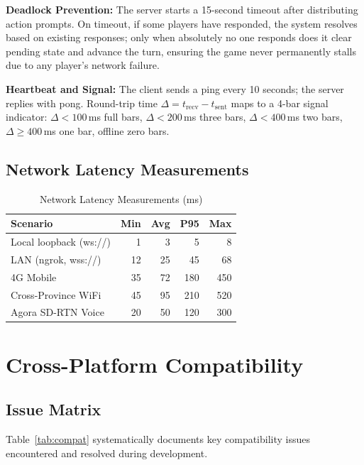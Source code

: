 \documentclass[11pt,a4paper]{article}
\begin{document}
\textbf{Deadlock Prevention:} The server starts a 15-second timeout after distributing action prompts. On timeout, if some players have responded, the system resolves based on existing responses; only when absolutely no one responds does it clear pending state and advance the turn, ensuring the game never permanently stalls due to any player's network failure.

\textbf{Heartbeat and Signal:} The client sends a ping every 10 seconds; the server replies with pong. Round-trip time $\Delta = t_{\text{recv}} - t_{\text{sent}}$ maps to a 4-bar signal indicator: $\Delta < 100$\,ms full bars, $\Delta < 200$\,ms three bars, $\Delta < 400$\,ms two bars, $\Delta \geq 400$\,ms one bar, offline zero bars.

\subsection{Network Latency Measurements}

\begin{table}[H]
\centering
\caption{Network Latency Measurements (ms)}
\label{tab:lat}
\footnotesize
\begin{tabular}{@{}lrrrr@{}}
\toprule
\textbf{Scenario} & \textbf{Min} & \textbf{Avg} & \textbf{P95} & \textbf{Max} \\
\midrule
Local loopback (ws://) & 1 & 3 & 5 & 8 \\
LAN (ngrok, wss://) & 12 & 25 & 45 & 68 \\
4G Mobile & 35 & 72 & 180 & 450 \\
Cross-Province WiFi & 45 & 95 & 210 & 520 \\
\midrule
Agora SD-RTN Voice & 20 & 50 & 120 & 300 \\
\bottomrule
\end{tabular}
\end{table}

\newpage
\section{Cross-Platform Compatibility}

\subsection{Issue Matrix}

Table~\ref{tab:compat} systematically documents key compatibility issues encountered and resolved during development.
\end{document}

